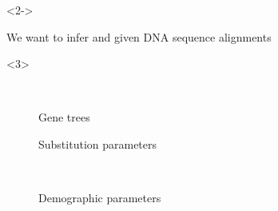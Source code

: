 \begin{frame}[t]
    \vspace{-1mm}

    \begin{minipage}[t][0.45\textheight][t]{\linewidth}
        \begin{uncoverenv}<2->
            \begin{center}
                We want to infer \textcolor{blue}{\divModel{}} and
                \textcolor{blue}{\divTimeMapVector} given DNA sequence
                alignments
                \textcolor{blue}{\alignmentVector}
            \end{center}
        \end{uncoverenv}


        \begin{adjustwidth}{.11\textwidth}{0em}
        \hspace{0.5\textwidth}
            \begin{onlyenv}<3>
                \begin{description}
                    \item[\ ] Gene trees
                    \item[\allParameters{}] Substitution parameters
                    \item[\ ] Demographic parameters
                \end{description}
            \end{onlyenv}
        \end{adjustwidth}
        

\end{minipage}
\end{frame}
